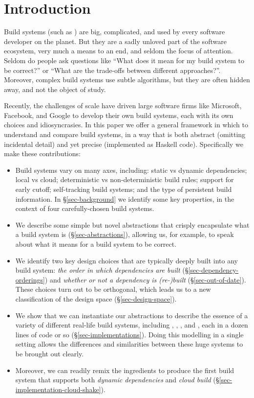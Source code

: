 \section{Introduction}\label{sec-intro}

Build systems (such as \Make) are big, complicated, and used by every
software developer on the planet.  But they are a sadly unloved part
of the software ecosystem, very much a means to an end, and seldom the
focus of attention.
Seldom do people ask questions like ``What does it mean for my build
system to be correct?'' or ``What are the trade-offs between different
approaches?''.  Moreover, complex build systems use subtle algorithms, but they
are often hidden away, and not the object of study.

Recently, the challenges of scale have driven large software firms
like Microsoft, Facebook, and Google to develop their own build
systems, each with its own choices and idiosyncrasies.
In this paper we offer a general framework in which to understand
and compare build systems,
in a way that is both abstract (omitting incidental detail)
and yet precise (implemented as Haskell code).  Specifically we make
these contributions:
\begin{itemize}
\item Build systems vary on many axes, including:
static vs dynamic dependencies; local vs cloud; deterministic vs
non-deterministic build rules; support for early cutoff; self-tracking build
systems; and the type of persistent build information.
In \S\ref{sec-background} we identify some key properties, in the context of
four carefully-chosen build systems.
\item We describe some simple but novel abstractions that
  crisply encapsulate what a build system is (\S\ref{sec-abstractions}),
  allowing us, for example, to speak about what it means for a build system to be correct.

\item We identify two key design choices
  that are typically deeply built into any build system:
  \emph{the order in which dependencies are built} (\S\ref{sec-dependency-orderings})
  and \emph{whether or not a dependency is (re-)built} (\S\ref{sec-out-of-date}).
  These choices turn out to be orthogonal, which leads us to a new
  classification of the design space (\S\ref{sec-design-space}).

\item We show that we can instantiate
our abstractions to describe the essence of a variety of different
real-life build systems, including \Make, \Shake, \Bazel, and \Excel, each in
a dozen lines of code or so (\S\ref{sec-implementations}).
Doing this modelling in a single setting allows
the differences and similarities between these huge systems to be
brought out clearly.

\item Moreover, we can readily remix the ingredients to produce the first
  build system that supports both \emph{dynamic dependencies}
  and \emph{cloud build} (\S\ref{sec-implementation-cloud-shake}).

\end{itemize}
